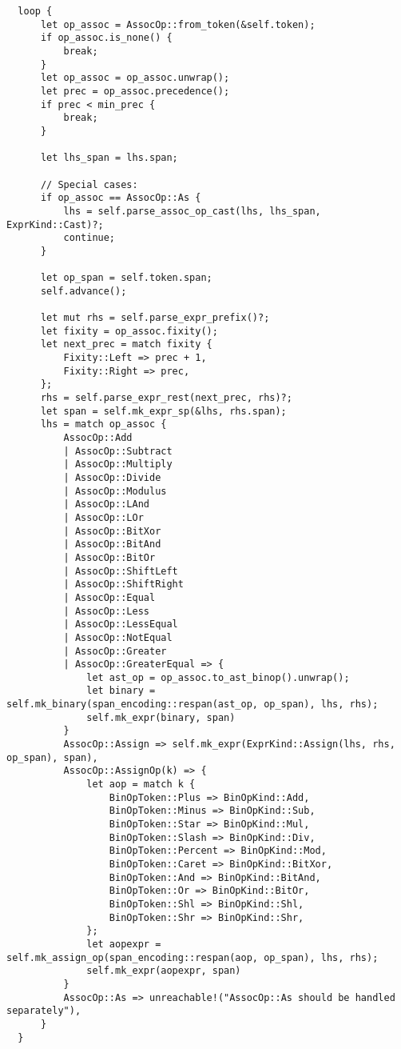 {\begin{lstlisting}
  loop {
      let op_assoc = AssocOp::from_token(&self.token);
      if op_assoc.is_none() {
          break;
      }
      let op_assoc = op_assoc.unwrap();
      let prec = op_assoc.precedence();
      if prec < min_prec {
          break;
      }

      let lhs_span = lhs.span;

      // Special cases:
      if op_assoc == AssocOp::As {
          lhs = self.parse_assoc_op_cast(lhs, lhs_span, ExprKind::Cast)?;
          continue;
      }

      let op_span = self.token.span;
      self.advance();

      let mut rhs = self.parse_expr_prefix()?;
      let fixity = op_assoc.fixity();
      let next_prec = match fixity {
          Fixity::Left => prec + 1,
          Fixity::Right => prec,
      };
      rhs = self.parse_expr_rest(next_prec, rhs)?;
      let span = self.mk_expr_sp(&lhs, rhs.span);
      lhs = match op_assoc {
          AssocOp::Add
          | AssocOp::Subtract
          | AssocOp::Multiply
          | AssocOp::Divide
          | AssocOp::Modulus
          | AssocOp::LAnd
          | AssocOp::LOr
          | AssocOp::BitXor
          | AssocOp::BitAnd
          | AssocOp::BitOr
          | AssocOp::ShiftLeft
          | AssocOp::ShiftRight
          | AssocOp::Equal
          | AssocOp::Less
          | AssocOp::LessEqual
          | AssocOp::NotEqual
          | AssocOp::Greater
          | AssocOp::GreaterEqual => {
              let ast_op = op_assoc.to_ast_binop().unwrap();
              let binary = self.mk_binary(span_encoding::respan(ast_op, op_span), lhs, rhs);
              self.mk_expr(binary, span)
          }
          AssocOp::Assign => self.mk_expr(ExprKind::Assign(lhs, rhs, op_span), span),
          AssocOp::AssignOp(k) => {
              let aop = match k {
                  BinOpToken::Plus => BinOpKind::Add,
                  BinOpToken::Minus => BinOpKind::Sub,
                  BinOpToken::Star => BinOpKind::Mul,
                  BinOpToken::Slash => BinOpKind::Div,
                  BinOpToken::Percent => BinOpKind::Mod,
                  BinOpToken::Caret => BinOpKind::BitXor,
                  BinOpToken::And => BinOpKind::BitAnd,
                  BinOpToken::Or => BinOpKind::BitOr,
                  BinOpToken::Shl => BinOpKind::Shl,
                  BinOpToken::Shr => BinOpKind::Shr,
              };
              let aopexpr = self.mk_assign_op(span_encoding::respan(aop, op_span), lhs, rhs);
              self.mk_expr(aopexpr, span)
          }
          AssocOp::As => unreachable!("AssocOp::As should be handled separately"),
      }
  }


\end{lstlisting}}
